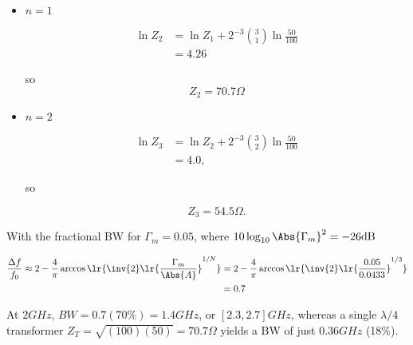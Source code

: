 {\begin{itemize}
\item \( n = 1 \)

\begin{equation}\label{eqn:uwavesDeck7MultisectionTransformersCore:540}
\begin{aligned}
\ln Z_{2}
&= \ln Z_1 + 2^{-3} \binom{3}{1} \ln \frac{50}{100} \\ &= 4.26
\end{aligned}
\end{equation}

so
\begin{equation}\label{eqn:uwavesDeck7MultisectionTransformersCore:560}
Z_2 = 70.7 \Omega
\end{equation}

\item \( n = 2 \)

\begin{equation}\label{eqn:uwavesDeck7MultisectionTransformersCore:580}
\begin{aligned}
\ln Z_{3} &= \ln Z_2 + 2^{-3} \binom{3}{2} \ln \frac{50}{100} \\ &= 4.0,
\end{aligned}
\end{equation}

so

\begin{equation}\label{eqn:uwavesDeck7MultisectionTransformersCore:600}
Z_3 = 54.5 \Omega.
\end{equation}

\end{itemize}


With the fractional BW for \( \Gamma_m = 0.05 \), where \( 10 \log_{10} \Abs{\Gamma_m}^2 = -26 \si{dB} \)

\begin{equation}\label{eqn:uwavesDeck7MultisectionTransformersCore:920}
\begin{aligned}
\frac{\Delta f}{f_0}
\approx
2 - \frac{4}{\pi} \arccos\lr{ \inv{2} \lr{ \frac{\Gamma_m}{\Abs{A}} }^{1/N} }
&=
2 - \frac{4}{\pi} \arccos\lr{ \inv{2} \lr{ \frac{0.05}{0.0433} }^{1/3} }
\\ &= 0.7
\end{aligned}
\end{equation}

At \( 2 \si{GHz} \), \( BW = 0.7 (70\%) = 1.4 \si{GHz} \), or \( [2.3,2.7] \si{GHz} \), whereas a single \( \lambda/4 \) transformer \( Z_T = \sqrt{ (100)(50) } = 70.7 \Omega \) yields a BW of just \( 0.36 \si{GHz} \) (18\%).

} %
